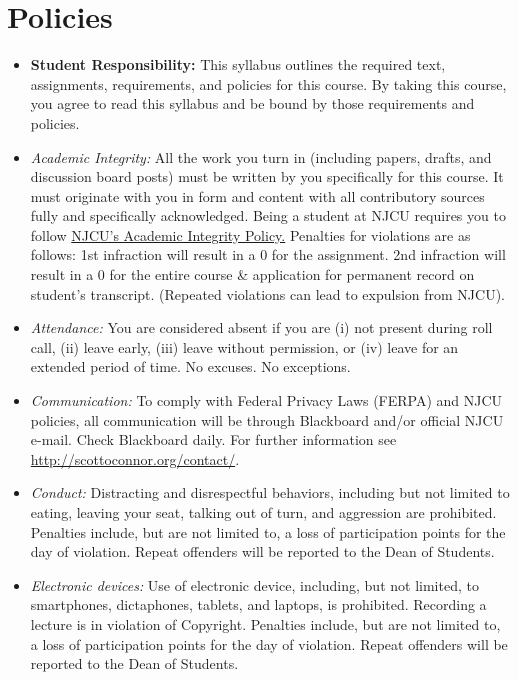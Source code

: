 \documentclass[article,oneside]{memoir}
\begin{document}
\section{Policies}

\begin{itemize}

\item \textbf{Student Responsibility:} This syllabus outlines the required text, assignments, requirements, and policies for this course. By taking this course, you agree to read this syllabus and be bound by those requirements and policies. 

 \item \textit{Academic Integrity:} All the work you turn in (including papers, drafts, and discussion board posts) must be written by you specifically for this course. It must originate with you in form and content with all contributory sources fully and specifically acknowledged. Being a student at NJCU requires you to follow \href{http://scottoconnor.org/resources/Plagiarism.pdf}{NJCU's Academic Integrity Policy.} Penalties for violations are as follows: 1st infraction will result in a 0 for the assignment.  2nd infraction will result in a 0 for the entire course \& application for permanent record on student's transcript. (Repeated violations can lead to expulsion from NJCU). 


\item \textit{Attendance:} You are considered absent if you are (i) not present during roll call, (ii) leave early, (iii) leave without permission, or (iv) leave for an extended period of time. No excuses. No exceptions.



\item \textit{Communication:} To comply with Federal Privacy Laws (FERPA) and NJCU policies, all communication will be through Blackboard and/or official NJCU e-mail. Check Blackboard daily. For further information see \href{http://scottoconnor.org/contact/}{http://scottoconnor.org/contact/}.

\item \textit{Conduct:} Distracting and disrespectful behaviors, including but not limited to eating, leaving your seat, talking out of turn, and aggression are prohibited. Penalties include, but are not limited to, a loss of participation points for the day of violation. Repeat offenders will be reported to the Dean of Students. 

\item \textit{Electronic devices:} Use of electronic device, including, but not limited, to smartphones, dictaphones, tablets, and laptops, is prohibited. Recording a lecture is in violation of Copyright. Penalties include, but are not limited to, a loss of participation points for the day of violation. Repeat offenders will be reported to the Dean of Students.



\end{itemize}
\end{document}

